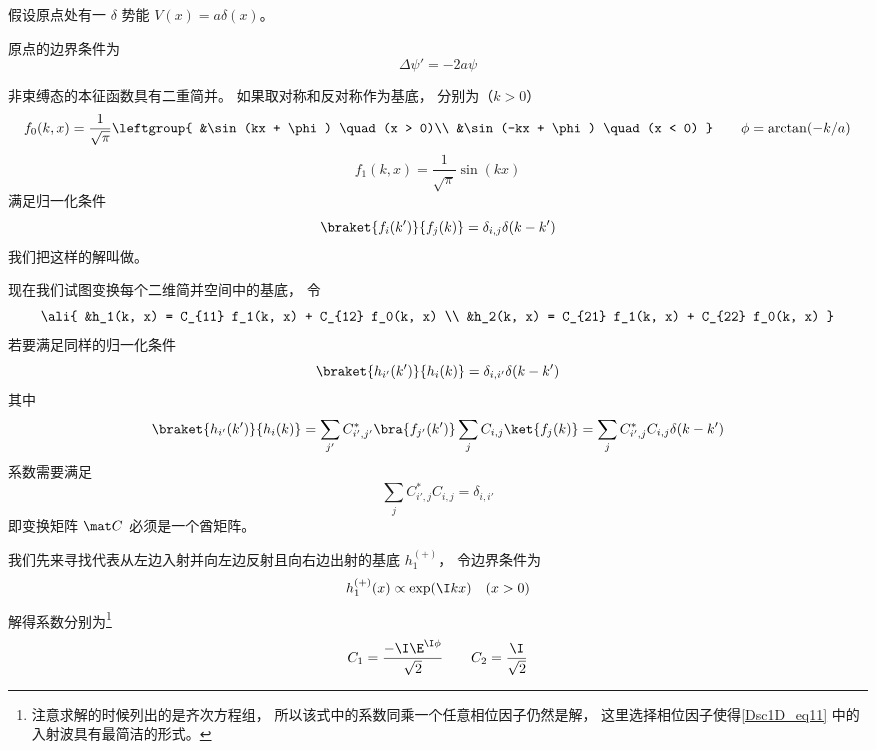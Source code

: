 
假设原点处有一 $\delta$ 势能 $V(x) = a\delta(x)$。

原点的边界条件为
\begin{equation}
\Delta \psi' = -2a \psi
\end{equation}

非束缚态的本征函数具有二重简并。 如果取对称和反对称作为基底， 分别为（$k > 0$）
\begin{equation}
f_0(k, x) = \frac{1}{\sqrt{\pi}}\leftgroup{
&\sin(kx + \phi) \quad (x > 0)\\
&\sin(-kx + \phi) \quad (x < 0)
} \qquad  \phi = \arctan(-k/a)
\end{equation}
\begin{equation}
f_1(k, x) = \frac{1}{\sqrt{\pi}}\sin(kx)
\end{equation}
满足归一化条件
\begin{equation}\label{Dsc1D_eq4}
\braket{f_i(k')}{f_j(k)} = \delta_{i,j} \delta(k - k')
\end{equation}
我们把这样的解叫做。

现在我们试图变换每个二维简并空间中的基底， 令
\begin{equation}\ali{
&h_1(k, x) =  C_{11} f_1(k, x) + C_{12} f_0(k, x) \\
&h_2(k, x) =  C_{21} f_1(k, x) + C_{22} f_0(k, x)
}\end{equation}
若要满足同样的归一化条件
\begin{equation}\label{Dsc1D_eq6}
\braket{h_{i'}(k')}{h_i(k)} = \delta_{i,i'}\delta(k - k')
\end{equation}
其中
\begin{equation}
\braket{h_{i'}(k')}{h_i(k)} = \sum_{j'} C_{i',j'}^* \bra{f_{j'}(k')} \sum_j C_{i, j} \ket{f_j(k)} = \sum_j C_{i', j}^* C_{i, j} \delta(k - k')
\end{equation}
系数需要满足
\begin{equation}
 \sum_j C_{i', j}^* C_{i, j} = \delta_{i, i'}
\end{equation}
即变换矩阵 $\mat C$ 必须是一个酋矩阵。

我们先来寻找代表从左边入射并向左边反射且向右边出射的基底 $h_1^{(+)}$， 令边界条件为
\begin{equation}
h_1^{(+)}(x) \propto \exp(\I k x) \quad (x > 0)
\end{equation}
解得系数分别为\footnote{注意求解的时候列出的是齐次方程组， 所以该式中的系数同乘一个任意相位因子仍然是解， 这里选择相位因子使得\autoref{Dsc1D_eq11} 中的入射波具有最简洁的形式。}
\begin{equation}
C_1 = \frac{-\I\E^{\I \phi}}{\sqrt{2}} \qquad
C_2 =  \frac{\I}{\sqrt{2}}
\end{equation}

